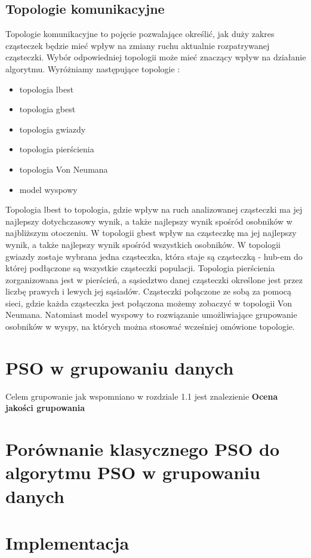 \documentclass[twoside]{pracaMagisterskaMS}
\begin{document}
\subsection{Topologie komunikacyjne}
Topologie komunikacyjne to pojęcie pozwalające określić, jak duży zakres cząsteczek będzie mieć wpływ na zmiany ruchu aktualnie rozpatrywanej cząsteczki. Wybór odpowiedniej topologii może mieć znaczący wpływ na działanie algorytmu. Wyróżniamy następujące topologie : 
\begin{itemize}
\item topologia lbest
\item topologia gbest
\item topologia gwiazdy
\item topologia pierścienia
\item topologia Von Neumana
\item model wyspowy
\end{itemize} 

Topologia lbest to topologia, gdzie wpływ na ruch analizowanej cząsteczki ma jej najlepszy dotychczasowy wynik, a także najlepszy wynik spośród osobników w najbliższym otoczeniu. W topologii gbest wpływ na cząsteczkę ma jej najlepszy wynik, a także najlepszy wynik spośród wszystkich osobników. W topologii gwiazdy zostaje wybrana jedna cząsteczka, która staje są cząsteczką - hub-em do której podłączone są wszystkie cząsteczki populacji. Topologia pierścienia zorganizowana jest w pierścień, a sąsiedztwo danej cząsteczki określone jest przez liczbę prawych i lewych jej sąsiadów. Cząsteczki połączone ze sobą za pomocą sieci, gdzie każda cząsteczka jest połączona możemy zobaczyć w topologii Von Neumana. Natomiast model wyspowy to rozwiązanie umożliwiające grupowanie osobników w wyspy, na których można stosować wcześniej omówione topologie.

\section{PSO w grupowaniu danych}
Celem grupowanie jak wspomniano w rozdziale 1.1 jest znalezienie %
\textbf{Ocena jakości grupowania}

\section{Porównanie klasycznego PSO do algorytmu PSO w grupowaniu danych}
\section{Implementacja}
\end{document}
